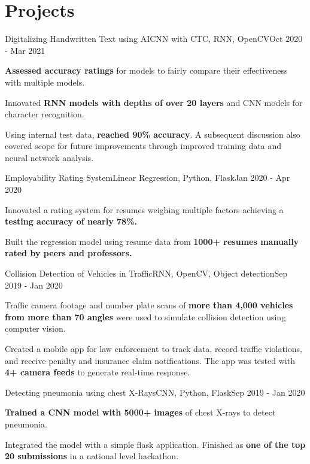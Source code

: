 \documentclass[letterpaper]{resume_config}
\begin{document}
\section{Projects}
\Project
    {Digitalizing Handwritten Text using AI}{CNN with CTC, RNN, OpenCV}{Oct 2020 - Mar 2021}
    {
        \item {\textbf{Assessed accuracy ratings} for models to fairly compare their effectiveness with multiple models.} \item {Innovated \textbf{RNN models with depths of over 20 layers} and CNN models for character recognition.}
        \item {Using internal test data, \textbf{reached 90\% accuracy}. A subsequent discussion also covered scope for future improvements through improved training data and neural network analysis.}
    }
\Project
    {Employability Rating System}{Linear Regression, Python, Flask}{Jan 2020 - Apr 2020}
    {
        \item {Innovated a rating system for resumes weighing multiple factors achieving a \textbf{testing accuracy of nearly 78\%.}}
        \item {Built the regression model using resume data from \textbf{1000+ resumes manually rated by peers and professors.}}
    }
\Project
    {Collision Detection of Vehicles in Traffic}{RNN, OpenCV, Object detection}{Sep 2019 - Jan 2020}
    {
        \item {Traffic camera footage and number plate scans of \textbf{more than 4,000 vehicles from more than 70 angles} were used to simulate collision detection using computer vision.}
        \item {Created a mobile app for law enforcement to track data, record traffic violations, and receive penalty and insurance claim notifications. The app was tested with \textbf{4+ camera feeds} to generate real-time response.}
    }
\Project
    {Detecting pneumonia using chest X-Rays}{CNN, Python, Flask}{Sep 2019 - Jan 2020}
    {
        \item{\textbf{Trained a CNN model with 5000+ images} of chest X-rays to detect pneumonia.}
        \item{Integrated the model with a simple flask application. Finished as \textbf{one of the top 20 submissions} in a national level hackathon.}
    }
\vspace{-10pt}
\end{document}
